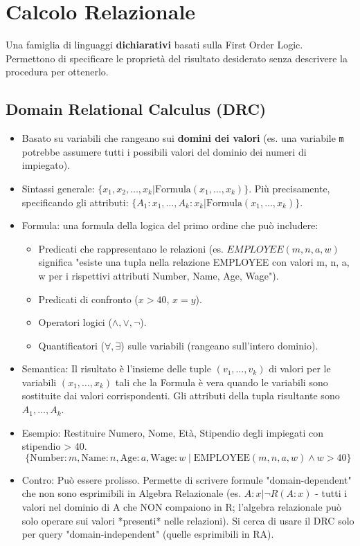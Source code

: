 \documentclass{article}
\newcommand{\landop}{\wedge}
\newcommand{\vel}{\vee}
\newcommand{\negop}{\neg}
\newcommand{\forallop}{\forall}
\newcommand{\existsop}{\exists}
\begin{document}
	\section{Calcolo Relazionale}
	Una famiglia di linguaggi \textbf{dichiarativi} basati sulla First Order Logic. Permettono di specificare le proprietà del risultato desiderato senza descrivere la procedura per ottenerlo.
	
	\subsection{Domain Relational Calculus (DRC)}
	\begin{itemize}
		\item Basato su variabili che rangeano sui \textbf{domini dei valori} (es. una variabile \texttt{m} potrebbe assumere tutti i possibili valori del dominio dei numeri di impiegato).
		\item Sintassi generale: $\{x_1, x_2, \dots, x_k | \text{Formula}(x_1, \dots, x_k)\}$. Più precisamente, specificando gli attributi: $\{ A_1: x_1, \dots, A_k: x_k | \text{Formula}(x_1, \dots, x_k) \}$.
		\item Formula: una formula della logica del primo ordine che può includere:
		\begin{itemize}
			\item Predicati che rappresentano le relazioni (es. $EMPLOYEE(m, n, a, w)$ significa "esiste una tupla nella relazione EMPLOYEE con valori m, n, a, w per i rispettivi attributi Number, Name, Age, Wage").
			\item Predicati di confronto ($x > 40$, $x = y$).
			\item Operatori logici ($\landop, \vel, \negop$).
			\item Quantificatori ($\forallop, \existsop$) sulle variabili (rangeano sull'intero dominio).
		\end{itemize}
		\item Semantica: Il risultato è l'insieme delle tuple $(v_1, \dots, v_k)$ di valori per le variabili $(x_1, \dots, x_k)$ tali che la Formula è vera quando le variabili sono sostituite dai valori corrispondenti. Gli attributi della tupla risultante sono $A_1, \dots, A_k$.
		\item Esempio: Restituire Numero, Nome, Età, Stipendio degli impiegati con stipendio > 40.
		$$ \{ \text{Number}: m, \text{Name}: n, \text{Age}: a, \text{Wage}: w \mid \text{EMPLOYEE}(m, n, a, w) \landop w > 40 \} $$
		\item Contro: Può essere prolisso. Permette di scrivere formule "domain-dependent" che non sono esprimibili in Algebra Relazionale (es. ${A: x | ¬R(A: x)}$ - tutti i valori nel dominio di A che NON compaiono in R; l'algebra relazionale può solo operare sui valori *presenti* nelle relazioni). Si cerca di usare il DRC solo per query "domain-independent" (quelle esprimibili in RA).
	\end{itemize}
	
\end{document}
